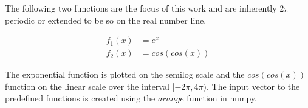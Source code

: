 \documentclass[a4paper, 12pt, margin= 1.25cm ]{article}
\begin{document}
\begin{multicols}{2}


    The following two functions are the focus of this work and are
inherently $2\pi$ periodic or extended to be so on the real number line.

\begin{align}
f_1(x) &= e^x\\
f_2(x ) &= cos(cos(x))
\end{align}

The exponential function is plotted on the semilog scale and the
$cos(cos(x))$ function on the linear scale over the interval
$[-2\pi, 4\pi)$. The input vector to the predefined functions is created
using the $arange$ function in numpy.

\end{multicols}
\end{document}
